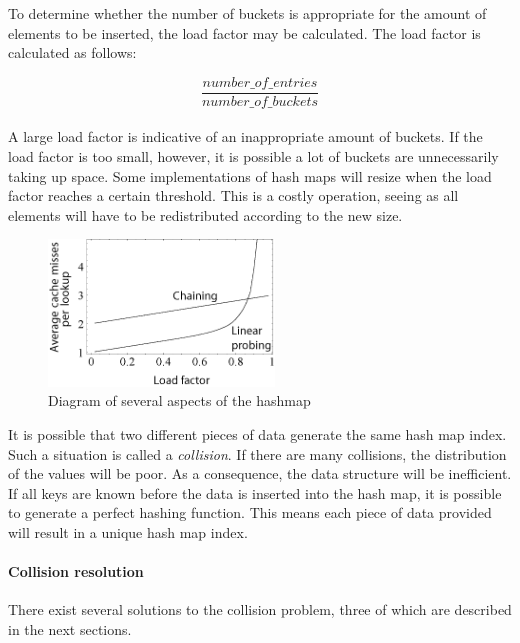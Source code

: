 \documentclass{article}
\begin{document}
\begin{samepage}
  To determine whether the number of buckets is appropriate for the amount of elements to be inserted,
  the load factor may be calculated. The load factor is calculated as follows:
  
  \begin{equation}
    \frac{number\_of\_entries}{number\_of\_buckets}
  \end{equation}

  \paragraph{}
  A large load factor is indicative of an inappropriate amount of buckets.
  If the load factor is too small, however, it is possible a lot of buckets are unnecessarily taking up space.
  Some implementations of hash maps will resize when the load factor reaches a certain threshold.
  This is a costly operation, seeing as all elements will have to be redistributed according to the new size.
\end{samepage}

\begin{figure}[H]
  \centering
  \includegraphics[width=6cm]{load_factor}
  \caption{Diagram of several aspects of the hashmap}
\end{figure}

It is possible that two different pieces of data generate the same hash map index.
Such a situation is called a {\em collision}. If there are many collisions, the distribution of the values
will be poor. As a consequence, the data structure will be inefficient. If all keys are known before the data
is inserted into the hash map, it is possible to generate a perfect hashing function. This means each piece of
data provided will result in a unique hash map index.

\paragraph{Collision resolution}
There exist several solutions to the collision problem, three of which are described in the next sections.
\end{document}
